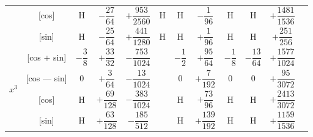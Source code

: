 \documentclass[11pt,a4paper]{book}
\begin{document}
{{\begin{center}
\begin{tabular}{|c|c|c|c|c|c|c|c|c|c|c|c|}
& [cos] & H & $-\dfrac{27}{64}$ & $+\dfrac{953}{2560}$ & H & H & $-\dfrac{1}{96}$ & H & H & $+\dfrac{1481}{1536}$ \\
& [sin] & H & $-\dfrac{25}{64}$ & $+\dfrac{441}{1280}$ & H & H & $+\dfrac{1}{96}$ & H & H & $+\dfrac{251}{256}$ \\
\hline
\multirow{4}{*}{$x^3$} & [cos + sin] & $-\dfrac{3}{8}$ & $+\dfrac{33}{32}$ & $-\dfrac{753}{1024}$ & & $-\dfrac{1}{2}$ & $+\dfrac{95}{64}$ & $-\dfrac{1}{8}$ & $-\dfrac{13}{64}$ & $+\dfrac{1577}{1024}$ \\
& [cos --- sin] & $0$ & $+\dfrac{3}{64}$ & $-\dfrac{13}{1024}$ & & $0$ & $+\dfrac{7}{192}$ & $0$ & $0$ & $+\dfrac{95}{3072}$ \\
& [cos] & H & $+\dfrac{69}{128}$ & $-\dfrac{383}{1024}$ & & H & $+\dfrac{73}{96}$ & H & H & $+\dfrac{2413}{3072}$ \\
& [sin] & H & $+\dfrac{63}{128}$ & $-\dfrac{185}{512}$ & & H & $+\dfrac{139}{192}$ & H & H & $+\dfrac{1159}{1536}$ \\
\hline
\end{tabular}
\end{center}

\newpage
{}

}}
\end{document}
